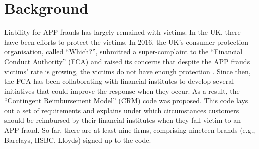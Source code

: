 
\section{Background}\label{sec::background}



Liability for  APP frauds has largely remained with  victims.  In the UK,  there have been  efforts  to protect the victims. In  2016, the UK's consumer protection organisation, called ``Which?'', submitted a super-complaint to the
 ``Financial Conduct Authority” (FCA) and  raised its concerns that despite the APP frauds victims' rate is  growing, the victims do not have enough protection \cite{Which?-super-complaint}.  Since then, the FCA has been collaborating with financial institutes  to develop several initiatives that
could  improve the response when they  occur. As a result,  the ``Contingent Reimbursement Model'' (CRM)  code  \cite{CRM-code} was proposed. This code  lays out a set of requirements and explains under which circumstances customers should be reimbursed by their  financial institutes when they fall victim to an APP fraud. So far,  there are at least nine firms, comprising nineteen brands (e.g., Barclays, HSBC,  Lloyds) signed up to the  code. 


